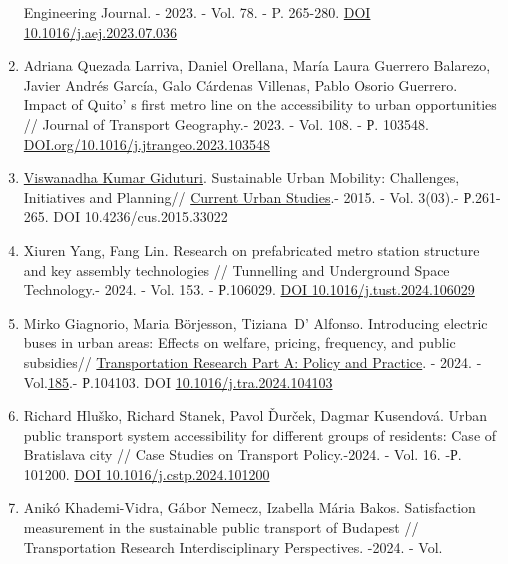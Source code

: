 \begin{enumerate}
  Engineering Journal. - 2023. - Vol. 78. - P. 265-280.
  \href{https://doi.org/10.1016/j.aej.2023.07.036}{DOI
  10.1016/j.aej.2023.07.036}
\item
  Adriana Quezada Larriva, Daniel Orellana, María Laura Guerrero
  Balarezo, Javier Andrés García, Galo Cárdenas Villenas, Pablo Osorio
  Guerrero. Impact of Quito' s first metro line on the
  accessibility to urban opportunities // Journal of Transport
  Geography.- 2023. - Vol. 108. - Р. 103548.
  \href{https://doi.org/10.1016/j.jtrangeo.2023.103548}{DOI.org/10.1016/j.jtrangeo.2023.103548}
\item
  \href{https://www.researchgate.net/profile/Viswanadha-Giduturi?_tp=eyJjb250ZXh0Ijp7ImZpcnN0UGFnZSI6InB1YmxpY2F0aW9uIiwicGFnZSI6InB1YmxpY2F0aW9uIn19}{Viswanadha
  Kumar Giduturi}. Sustainable Urban Mobility: Challenges, Initiatives
  and Planning//
  \href{https://www.researchgate.net/journal/Current-Urban-Studies-2328-4919?_tp=eyJjb250ZXh0Ijp7ImZpcnN0UGFnZSI6InB1YmxpY2F0aW9uIiwicGFnZSI6InB1YmxpY2F0aW9uIn19}{Current
  Urban Studies}.- 2015. - Vol. 3(03).- Р.261-265. DOI
  10.4236/cus.2015.33022
\item
  Xiuren Yang, Fang Lin. Research on prefabricated metro station
  structure and key assembly technologies // Tunnelling and Underground
  Space Technology.- 2024. - Vol. 153. - Р.106029.
  \href{https://doi.org/10.1016/j.tust.2024.106029}{DOI
  10.1016/j.tust.2024.106029}
\item
  Mirko Giagnorio, Maria Börjesson, Tiziana~D' Alfonso.
  Introducing electric buses in urban areas: Effects on welfare,
  pricing, frequency, and public subsidies//
  \href{https://www.sciencedirect.com/journal/transportation-research-part-a-policy-and-practice}{Transportation
  Research Part A: Policy and Practice}. - 2024. -
  Vol.\href{https://www.sciencedirect.com/journal/transportation-research-part-a-policy-and-practice/vol/185/suppl/C}{185}.-
  Р.104103. DOI
  \href{https://doi.org/10.1016/j.tra.2024.104103}{10.1016/j.tra.2024.104103}
\item
  Richard Hluško, Richard Stanek, Pavol Ďurček, Dagmar Kusendová. Urban
  public transport system accessibility for different groups of
  residents: Case of Bratislava city // Case Studies on Transport
  Policy.-2024. - Vol. 16. -Р. 101200.
  \href{https://doi.org/10.1016/j.cstp.2024.101200}{DOI
  10.1016/j.cstp.2024.101200}
\item
  Anikó Khademi-Vidra, Gábor Nemecz, Izabella Mária Bakos. Satisfaction
  measurement in the sustainable public transport of Budapest //
  Transportation Research Interdisciplinary Perspectives. -2024. - Vol.

\end{enumerate}
